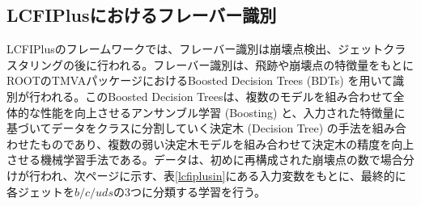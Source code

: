 \subsection{LCFIPlusにおけるフレーバー識別}
LCFIPlusのフレームワークでは、フレーバー識別は崩壊点検出、ジェットクラスタリングの後に行われる。フレーバー識別は、飛跡や崩壊点の特徴量をもとにROOTのTMVAパッケージにおけるBoosted Decision Trees (BDTs) を用いて識別が行われる。このBoosted Decision Treesは、複数のモデルを組み合わせて全体的な性能を向上させるアンサンブル学習 (Boosting) と、入力された特徴量に基づいてデータをクラスに分割していく決定木 (Decision Tree) の手法を組み合わせたものであり、複数の弱い決定木モデルを組み合わせて決定木の精度を向上させる機械学習手法である。データは、初めに再構成された崩壊点の数で場合分けが行われ、次ページに示す、表\ref{lcfiplusin}にある入力変数をもとに、最終的に各ジェットを$b/c/uds$の3つに分類する学習を行う。
